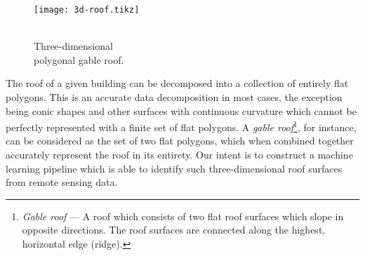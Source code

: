 \begin{wrapfigure}[10]{r}{0.25\textwidth}
  \vspace{-2em}
  \begin{center}
    \texttt{[image: 3d-roof.tikz]}
  \end{center}
  \caption{%
    \\
    Three-dimensional\\polygonal gable roof.
  }%
  \label{fig:gable-roof}
\end{wrapfigure}

The roof of a given building can be decomposed into a collection of entirely flat polygons.
This is an accurate data decomposition in most cases, the exception being conic shapes and other surfaces with continuous curvature which cannot be perfectly represented with a finite set of flat polygons.
A \emph{gable roof}\footnote{\textit{Gable roof} --- A roof which consists of two flat roof surfaces which slope in opposite directions.
The roof surfaces are connected along the highest, horizontal edge (ridge).}, for instance, can be considered as the set of two flat polygons, which when combined together accurately represent the roof in its entirety.
Our intent is to construct a machine learning pipeline which is able to identify such three-dimensional roof surfaces from remote sensing data.

